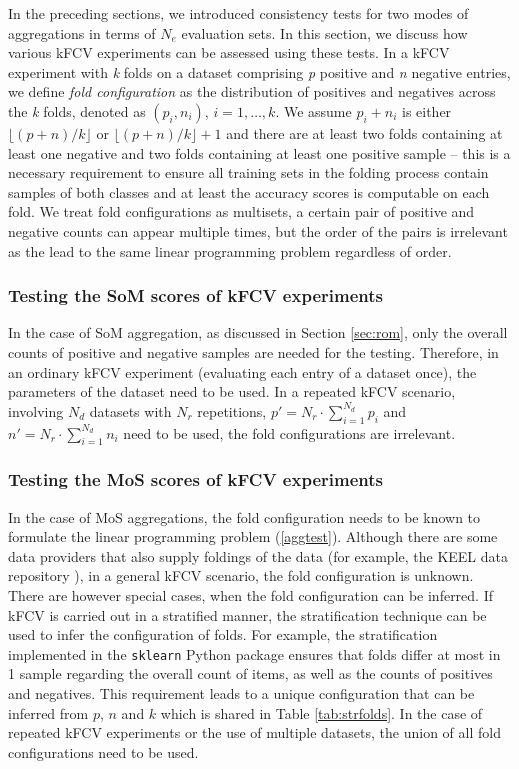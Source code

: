 \documentclass[3p, times]{elsarticle}
\begin{document}
In the preceding sections, we introduced consistency tests for two modes of aggregations in terms of $N_e$ evaluation sets. In this section, we discuss how various kFCV experiments can be assessed using these tests. In a kFCV experiment with \emph{k} folds on a dataset comprising \emph{p} positive and \emph{n} negative entries, we define \emph{fold configuration} as the distribution of positives and negatives across the \emph{k} folds, denoted as $(p_i, n_i)$, $i=1, \dots, k$. We assume $p_i + n_i$ is either $\lfloor (p + n) / k\rfloor$ or $\lfloor (p + n) / k\rfloor + 1$ and there are at least two folds containing at least one negative and two folds containing at least one positive sample -- this is a necessary requirement to ensure all training sets in the folding process contain samples of both classes and at least the accuracy scores is computable on each fold.
We treat fold configurations as multisets, a certain pair of positive and negative counts can appear multiple times, but the order of the pairs is irrelevant as the lead to the same linear programming problem regardless of order.

\subsubsection{Testing the SoM scores of kFCV experiments}
\label{sec:somkfcv}

In the case of SoM aggregation, as discussed in Section \ref{sec:rom}, only the overall counts of positive and negative samples are needed for the testing. Therefore, in an ordinary kFCV experiment (evaluating each entry of a dataset once), the parameters of the dataset need to be used. In a repeated kFCV scenario, involving $N_d$ datasets with $N_r$ repetitions, $p'=N_r\cdot \sum\limits_{i=1}^{N_d} p_i$ and $n'=N_r\cdot \sum\limits_{i=1}^{N_d} n_i$ need to be used, the fold configurations are irrelevant.

\subsubsection{Testing the MoS scores of kFCV experiments}
\label{sec:moskfcv}

In the case of MoS aggregations, the fold configuration needs to be known to formulate the linear programming problem (\ref{aggtest}). Although there are some data providers that also supply foldings of the data (for example, the KEEL data repository \cite{keel}), in a general kFCV scenario, the fold configuration is unknown. There are however special cases, when the fold configuration can be inferred. If kFCV is carried out in a stratified manner, the stratification technique can be used to infer the configuration of folds. For example, the stratification implemented in the \verb|sklearn| \cite{sklearn} Python package ensures that folds differ at most in 1 sample regarding the overall count of items, as well as the counts of positives and negatives. This requirement leads to a unique configuration that can be inferred from $p$, $n$ and $k$ which is shared in Table \ref{tab:strfolds}. In the case of repeated kFCV experiments or the use of multiple datasets, the union of all fold configurations need to be used.
\end{document}
